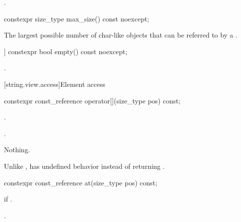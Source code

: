 \begin{itemdescr}
\pnum
\returns
{}.
\end{itemdescr}


%
\begin{itemdecl}
constexpr size_type max_size() const noexcept;
\end{itemdecl}

\begin{itemdescr}
\pnum
\returns
The largest possible number of char-like objects that can be referred to by a .
\end{itemdescr}

%
\begin{itemdecl}
[[nodiscard]] constexpr bool empty() const noexcept;
\end{itemdecl}

\begin{itemdescr}
\pnum
\returns
{}.
\end{itemdescr}

[string.view.access]{Element access}

%
\begin{itemdecl}
constexpr const_reference operator[](size_type pos) const;
\end{itemdecl}

\begin{itemdescr}
\pnum
\expects
{}.

\pnum
\returns
{}.

\pnum
\throws
Nothing.

\pnum
\begin{note}
Unlike ,
 has undefined behavior instead of returning .
\end{note}
\end{itemdescr}

%
\begin{itemdecl}
constexpr const_reference at(size_type pos) const;
\end{itemdecl}

\begin{itemdescr}
\pnum
\throws
{} if .

\pnum
\returns
{}.
\end{itemdescr}

